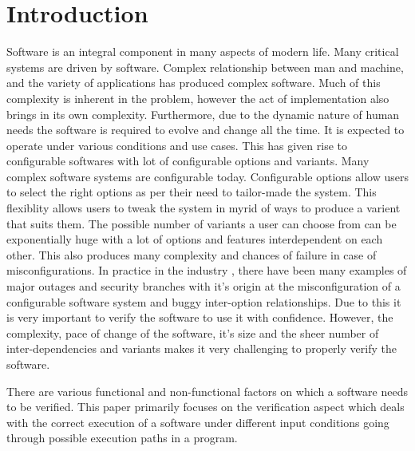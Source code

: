 \documentclass[	runningheads,
				a4paper]{llncs}
\begin{document}
\section{Introduction}
Software is an integral component in many aspects of modern life. Many critical systems are driven by software. Complex relationship between man and machine, and the variety of applications has produced complex software. Much of this complexity is inherent in the problem, however the act of implementation also brings in its own complexity. Furthermore, due to the dynamic nature of human needs the software is required to evolve and change all the time. It is expected to operate under various conditions and use cases. This has given rise to configurable softwares with lot of configurable options and variants. Many complex software systems are configurable today. Configurable options allow users to select the right options as per their need to tailor-made the system. This flexiblity allows users to tweak the system in myrid of ways to produce a varient that suits them. The possible number of variants a user can choose from can be exponentially huge with a lot of options and features interdependent on each other. This also produces many complexity and chances of failure in case of misconfigurations. In practice in the industry \cite[Holistic configuration management at faceboo]{tang2015holistic}, there have been many examples of major outages and security branches with it's origin at the misconfiguration of a configurable software system and buggy inter-option relationships. Due to this it is very important to verify the software to use it with confidence. However, the complexity, pace of change of the software, it's size and the sheer number of inter-dependencies and variants makes it very challenging to properly verify the software. 

There are various functional and non-functional factors on which a software needs to be verified. This paper primarily focuses on the verification aspect which deals with the correct execution of a software under different input conditions going through possible execution paths in a program.
\end{document}
